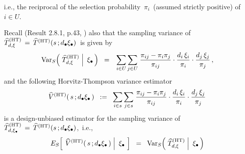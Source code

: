 \begin{itemize}
\begin{itemize}
        i.e., the reciprocal of the selection probability \,$\pi_{i}$\,
        (assumed strictly positive) of \,$i \in U$.\,
    \end{itemize}
    Recall (Result 2.8.1, p.43, \cite{Sarndal1992}) also that
    the sampling variance of 
    \,$
    \widehat{T}^{\textnormal{(HT)}}_{d,\xi}
    \,=\,
        \widehat{T}^{\textnormal{(HT)}}(s\,;d_{\bullet}\xi_{\bullet})
    $\,
    is given by
    \begin{equation*}
    \Var_{S}\!\left(\,
        \left.
        \widehat{T}^{\textnormal{(HT)}}_{d,\xi} %
        \;\right\vert\!
        \begin{array}{c} \xi_{\bullet} \end{array}
        \!\!\right)
    \;\; = \;\;\,
        \underset{i \in U}{\sum}\,
        \underset{j \in U}{\sum}\;
        \dfrac{\pi_{ij} - \pi_{i}\pi_{j}}{\pi_{ij}}
        \cdot
        \dfrac{d_{i}\,\xi_{i}}{\pi_{i}}
        \cdot
        \dfrac{d_{j}\,\xi_{j}}{\pi_{j}}\,,
    \end{equation*}
    and the following Horvitz-Thompson variance estimator
    \begin{equation*}
    \widehat{V}^{\textnormal{(HT)}}(\,s\,;d_{\bullet}\xi_{\bullet}\,)
    \;\; := \;\;
        \underset{i \in s}{\sum}\,
        \underset{j \in s}{\sum}\;
        \dfrac{\pi_{ij} - \pi_{i}\pi_{j}}{\pi_{ij}}
        \cdot
        \dfrac{d_{i}\,\xi_{i}}{\pi_{i}}
        \cdot
        \dfrac{d_{j}\,\xi_{j}}{\pi_{j}}
    \end{equation*}
    is a design-unbiased estimator for the sampling variance of
    \,$
    \widehat{T}^{\textnormal{(HT)}}_{d,\xi_{\bullet}}
    \,=\,
        \widehat{T}^{\textnormal{(HT)}}(s\,;d_{\bullet}\xi_{\bullet})
    $,\,
    i.e.,
    \begin{equation*}
    E_{S}\!\left[\;
        \left.
        \widehat{V}^{\textnormal{(HT)}}(\,s\,;\dbullet\xi_{\bullet}\,)
        \;\right\vert\!
        \begin{array}{c} \xi_{\bullet} \end{array}
        \!\right]
    \;\; = \;\;
        \Var_{S}\!\left(\,
            \left.
            \widehat{T}^{\textnormal{(HT)}}_{d,\xi} %
            \;\right\vert\!
            \begin{array}{c} \xi_{\bullet} \end{array}
            \!\!\right)

\end{equation*}
\end{itemize}
